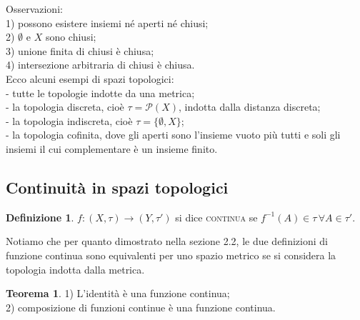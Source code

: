 \documentclass{article}
\theoremstyle{definition}
\newtheorem*{thm}{Teorema}
\newtheorem*{defn}{Definizione}
\begin{document}
	Osservazioni: \\
	1) possono esistere insiemi né aperti né chiusi; \\
	2) $\emptyset$ e $X$ sono chiusi; \\
	3) unione finita di chiusi è chiusa; \\
	4) intersezione arbitraria di chiusi è chiusa. \\
	
	Ecco alcuni esempi di spazi topologici: \\
	- tutte le topologie indotte da una metrica; \\
	- la topologia discreta, cioè $\tau=\mathcal{P}(X)$, indotta dalla distanza discreta; \\
	- la topologia indiscreta, cioè $\tau=\{ \emptyset, X \}$; \\
	- la topologia cofinita, dove gli aperti sono l'insieme vuoto più tutti e soli gli insiemi il cui complementare è un insieme finito.
	
	\subsection{Continuità in spazi topologici}
	
	\begin{defn}
		$f: (X, \tau) \rightarrow (Y, \tau')$ si dice \textsc{continua} se $f^{-1}(A) \in \tau \, \forall A \in \tau'$.
	\end{defn}
	
	Notiamo che per quanto dimostrato nella sezione 2.2, le due definizioni di funzione continua sono equivalenti per uno spazio metrico se si considera la topologia indotta dalla metrica.
	
	\begin{thm}
		1) L'identità è una funzione continua; \\
		2) composizione di funzioni continue è una funzione continua.
	\end{thm}
	
\end{document}
